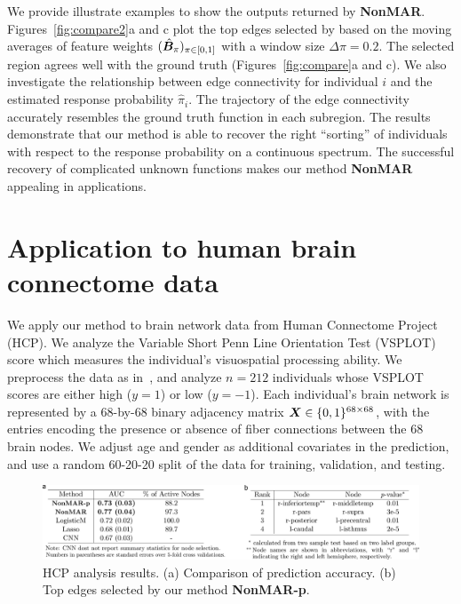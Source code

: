 \documentclass[11pt]{article}
\theoremstyle{definition}
\def\NonparaM{\text{\bf \small NonMAR }}
\begin{document}
We provide illustrate examples to show the outputs returned by {\bf \small NonMAR}. Figures~\ref{fig:compare2}a and c plot the top edges selected by \NonparaM based on the moving averages of feature weights $(\hat {\bm B}_\pi)_{\pi\in[0,1]}$ with a window size $\Delta \pi = 0.2$. The selected region agrees well with the ground truth (Figures~\ref{fig:compare}a and c). We also investigate the relationship between edge connectivity for individual $i$ and the estimated response probability $\hat \pi_i$. The trajectory of the edge connectivity accurately resembles the ground truth function in each subregion. The results demonstrate that our method is able to recover the right ``sorting'' of individuals with respect to the response probability on a continuous spectrum. 
The successful recovery of complicated unknown functions makes our method {\bf \small NonMAR} appealing in applications. 

\section{Application to human brain connectome data}

We apply our method to brain network data from Human Connectome Project (HCP). We analyze the Variable Short Penn Line Orientation Test (VSPLOT) score which measures the individual's visuospatial processing ability. We preprocess the data as in~\cite{wang2019common}, and analyze $n=212$ individuals whose VSPLOT scores are either high ($y=1$) or low ($y=-1$). Each individual's brain network is represented by a 68-by-68 binary adjacency matrix $\bm X\in\{0,1\}^{68\times 68}$, with the entries encoding the presence or absence of fiber connections between the 68 brain nodes. We adjust age and gender as additional covariates in the prediction, and use a random 60-20-20 split of the data for training, validation, and testing. 

\begin{figure}[H]
    \centering
       \includegraphics[width=\textwidth]{braintable.pdf}
 \caption{HCP analysis results. (a) Comparison of prediction accuracy. (b) Top edges selected by our method {\scriptsize \bf NonMAR-p}. }\label{fig:real}
\end{figure}
\end{document}
